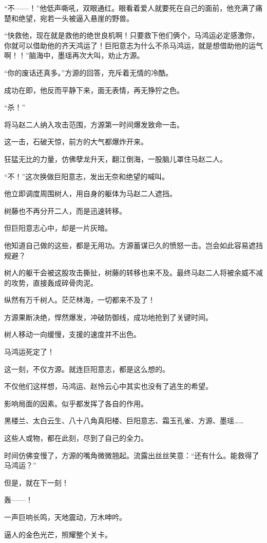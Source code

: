 \begin{this_body}
“不——！”他低声嘶吼，双眼通红。眼看着爱人就要死在自己的面前，他充满了痛楚和绝望，宛若一头被逼入悬崖的野兽。

“快救他，现在就是救他的绝世良机啊！只要救下他们俩个，马鸿运必定感激你，你就可以借助他的齐天鸿运了！巨阳意志为什么不杀马鸿运，就是想借助他的运气啊！！”脑海中，墨瑶再次大叫，劝止方源。

“你的废话还真多。”方源的回答，充斥着无情的冷酷。

成功在即，他反而平静下来，面无表情，再无狰狞之色。

“杀！”

将马赵二人纳入攻击范围，方源第一时间爆发致命一击。

这一击，石破天惊，前方的大气都爆炸开来。

狂猛无比的力量，仿佛孽龙升天，翻江倒海，一股脑儿罩住马赵二人。

“不！”这次换做巨阳意志，发出无奈和绝望的喊叫。

他立即调度周围树人，用自身的躯体为马赵二人遮挡。

树藤也不再分开二人，而是迅速转移。

但巨阳意志心中，却是一片灰暗。

他知道自己做的这些，都是无用功。方源蓄谋已久的愤怒一击。岂会如此容易遮挡规避？

树人的躯干会被这股攻击撕扯，树藤的转移也来不及。最终马赵二人将被余威不减的攻势，直接轰成碎骨肉泥。

纵然有万千树人。茫茫林海，一切都来不及了！

方源果断决绝，悍然爆发，冲破防御线，成功地抢到了关键时间。

树人移动一向缓慢，支援的速度并不出色。

马鸿运死定了！

这一刻，不仅方源。就连巨阳意志，都是这么想的。

不仅他们这样想，马鸿运、赵怜云心中其实也没有了逃生的希望。

影响局面的因素。似乎都发挥了各自的作用。

黑楼兰、太白云生、八十八角真阳楼、巨阳意志、霜玉孔雀、方源、墨瑶……

这些人或物，都在此刻，尽到了自己的全力。

时间仿佛变慢了，方源的嘴角微微翘起。流露出丝丝笑意：“还有什么。能救得了马鸿运？”

但是，就在下一刻！

轰——！

一声巨响长鸣，天地震动，万木呻吟。

逼人的金色光芒，照耀整个关卡。


\end{this_body}
